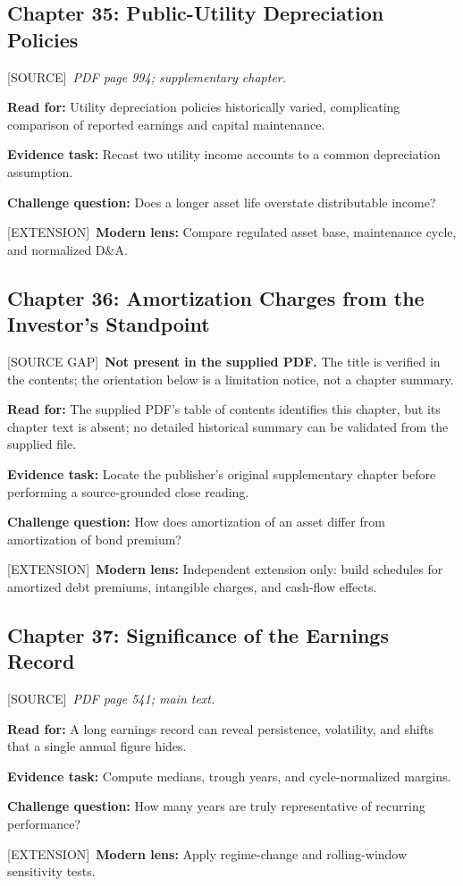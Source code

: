 \documentclass[11pt,letterpaper]{article}
\newcommand{\src}{\textsf{\color{sea}[SOURCE]}}
\newcommand{\ext}{\textsf{\color{gold}[EXTENSION]}}
\newcommand{\gap}{\textsf{\color{red}[SOURCE GAP]}}
\begin{document}
\subsection{Chapter 35: Public-Utility Depreciation Policies}
\src\ \textit{PDF page 994; supplementary chapter.}\par
\textbf{Read for:} Utility depreciation policies historically varied, complicating comparison of reported earnings and capital maintenance.\par
\textbf{Evidence task:} Recast two utility income accounts to a common depreciation assumption.\par
\textbf{Challenge question:} Does a longer asset life overstate distributable income?\par
\ext\ \textbf{Modern lens:} Compare regulated asset base, maintenance cycle, and normalized D\&A.\par

\subsection{Chapter 36: Amortization Charges from the Investor's Standpoint}
\gap\ \textbf{Not present in the supplied PDF.} The title is verified in the contents; the orientation below is a limitation notice, not a chapter summary.\par
\textbf{Read for:} The supplied PDF's table of contents identifies this chapter, but its chapter text is absent; no detailed historical summary can be validated from the supplied file.\par
\textbf{Evidence task:} Locate the publisher's original supplementary chapter before performing a source-grounded close reading.\par
\textbf{Challenge question:} How does amortization of an asset differ from amortization of bond premium?\par
\ext\ \textbf{Modern lens:} Independent extension only: build schedules for amortized debt premiums, intangible charges, and cash-flow effects.\par

\subsection{Chapter 37: Significance of the Earnings Record}
\src\ \textit{PDF page 541; main text.}\par
\textbf{Read for:} A long earnings record can reveal persistence, volatility, and shifts that a single annual figure hides.\par
\textbf{Evidence task:} Compute medians, trough years, and cycle-normalized margins.\par
\textbf{Challenge question:} How many years are truly representative of recurring performance?\par
\ext\ \textbf{Modern lens:} Apply regime-change and rolling-window sensitivity tests.\par
\end{document}
